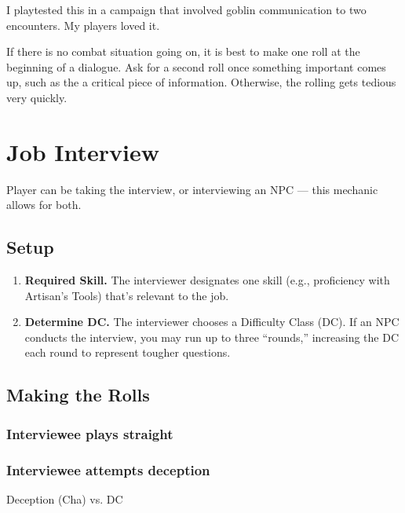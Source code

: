 \documentclass[twocolumn]{dndbook}
\begin{document}
I playtested this in a campaign that involved goblin communication to two encounters. My players loved it.\par

If there is no combat situation going on, it is best to make one roll at the beginning of a dialogue.
Ask for a second roll once something important comes up, such as the a critical piece of information.
Otherwise, the rolling gets tedious very quickly.





\section{Job Interview}
\label{sec:job_interview}


Player can be taking the interview, or interviewing an NPC --- this mechanic allows for both.\par

\subsection{Setup}
\begin{enumerate}
  \item \textbf{Required Skill.} The interviewer designates one skill (e.g., proficiency with Artisan’s Tools) that’s relevant to the job.
  \item \textbf{Determine DC.} The interviewer chooses a Difficulty Class (DC). If an NPC conducts the interview, you may run up to three “rounds,” increasing the DC each round to represent tougher questions.
\end{enumerate}

\subsection{Making the Rolls}

\subsubsection{Interviewee plays straight}
\subsubsection{Interviewee attempts deception}
Deception (Cha) vs. DC
\end{document}
